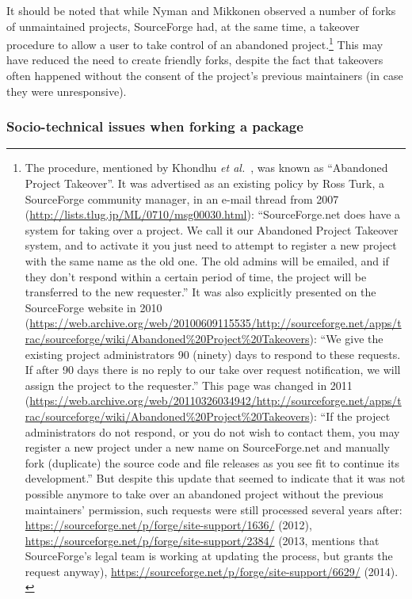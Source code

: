 It should be noted that while Nyman and Mikkonen observed a number of forks of unmaintained projects, SourceForge had, at the same time, a takeover procedure to allow a user to take control of an abandoned project.\footnote{
	The procedure, mentioned by Khondhu \emph{et al.}~\cite{khondhu2013all}, was known as ``Abandoned Project Takeover''.
	It was advertised as an existing policy by Ross Turk, a SourceForge community manager, in an e-mail thread from 2007 (\url{http://lists.tlug.jp/ML/0710/msg00030.html}):
	``SourceForge.net does have a system for taking over a project.
	We call	it our Abandoned Project Takeover system, and to activate it you just need to attempt to register a new project with the same name as the old one.
	The old admins will be emailed, and if they don't respond within a certain period of time, the project will be transferred to the new requester.''
	It was also explicitly presented on the SourceForge website in 2010 (\url{https://web.archive.org/web/20100609115535/http://sourceforge.net/apps/trac/sourceforge/wiki/Abandoned\%20Project\%20Takeovers}):
	``We give the existing project administrators 90 (ninety) days to respond to these requests. If after 90 days there is no reply to our take over request notification, we will assign the project to the requester.''
	This page was changed in 2011 (\url{https://web.archive.org/web/20110326034942/http://sourceforge.net/apps/trac/sourceforge/wiki/Abandoned\%20Project\%20Takeovers}):
	``If the project administrators do not respond, or you do not wish to contact them, you may register a new project under a new name on SourceForge.net and manually fork (duplicate) the source code and file releases as you see fit to continue its development.''
	But despite this update that seemed to indicate that it was not possible anymore to take over an abandoned project without the previous maintainers' permission, such requests were still processed several years after:
	\url{https://sourceforge.net/p/forge/site-support/1636/} (2012), \url{https://sourceforge.net/p/forge/site-support/2384/} (2013, mentions that SourceForge's legal team is working at updating the process, but grants the request anyway), \url{https://sourceforge.net/p/forge/site-support/6629/} (2014).
	\label{footnote:apt}
}
This may have reduced the need to create friendly forks, despite the fact that takeovers often happened without the consent of the project's previous maintainers (in case they were unresponsive).

\subsubsection{Socio-technical issues when forking a package}

